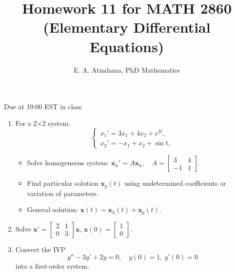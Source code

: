 \documentclass[a4paper,11pt,reqno]{amsart}
\title[MATH 2860 (Elementary Differential Equations)]{Homework 11 for MATH 2860 (Elementary Differential Equations)}
\author[Emmanuel Atindama]{E. A. Atindama, PhD Mathematics}
\numberwithin{equation}{section}
\begin{document}
\maketitle

Due at 10:00 EST in class

\begin{enumerate}[1.]
  \item For a 2×2 system:
    \[
    \begin{cases}
    x_1' = 3 x_1 + 4 x_2 + e^{2t},\\
    x_2' = -x_1 + x_2 + \sin t,
    \end{cases}
    \]
    \begin{itemize}
      \item[(a)] Solve homogeneous system:
      \(\mathbf{x}_h' = A \mathbf{x}_h, \quad A = \begin{bmatrix}3 & 4 \\ -1 & 1\end{bmatrix}\).
      \item[(b)] Find particular solution $\mathbf{x}_p(t)$ using undetermined coefficients or variation of parameters.
      \item[(c)] General solution: \(\mathbf{x}(t) = \mathbf{x}_h(t) + \mathbf{x}_p(t)\).
    \end{itemize}
  \vspace{1cm}

    \begin{center}\setlength{\fboxsep}{10pt}
    \end{center}

  \item Solve $\mathbf{x}' = \begin{bmatrix} 2 & 1 \\ 0 & 3 \end{bmatrix} \mathbf{x}$, $\mathbf{x}(0) = \begin{bmatrix} 1 \\ 0 \end{bmatrix}$.
  \vspace{1cm}

    \begin{center}\setlength{\fboxsep}{10pt}
    \end{center}

  \item Convert the IVP
        \[
        y'' - 3y' + 2y = 0, \quad y(0)=1, \ y'(0)=0
        \]
        into a first-order system.
      \begin{center}\setlength{\fboxsep}{10pt}
      \end{center}
\end{enumerate}
\end{document}
